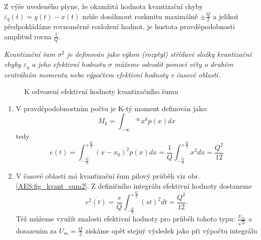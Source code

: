       Z výše uvedeného plyne, že okamžitá hodnota kvantizační chyby $\varepsilon_q(t) = y(t) - x(t)$ může dosáhnout rozkmitu maximálně $\pm \frac{Q}{2}$ a jelikož předpokládáme rovnoměrné rozložení hodnot, je hustota pravděpodobnosti amplitud rovna $\frac{1}{Q}$.

      \emph{Kvantizační šum $\sigma^2$ je definován jako výkon (rozptyl) střídavé složky kvantizační chyby $\varepsilon_q$ a jeho efektivní hodnotu $\sigma$ můžeme odvodit pomocí věty o druhém centrálním momentu nebo výpočtem efektivní hodnoty v časové oblasti.}

        \begin{figure}[ht!]
          \centering
          \caption{K odvození efektivní hodnoty kvantizačního šumu}
          \label{AES:fig_kvant_sum}
        \end{figure}

        \begin{enumerate}
          \item V pravděpodobnostním počtu je K-tý moment definován jako: $$M_k = \int_{-\infty}{^\infty} 
                x^k p(x)dx$$ tedy $$e(t) = \int_{-\frac{Q}{2}}^{+\frac{Q}{2}}(x - x_0)^2p(x)dx = 
                \frac{1}{Q}\int_{-\frac{Q}{2}}^{+\frac{Q}{2}}x^2dx = \frac{Q^2}{12}$$
          \item V časové oblasti má kvantizační šum pilový průběh viz obr. \ref{AES:fig_kvant_sum2}. Z  
                definičního integrálu efektivní hodnoty dostaneme $$ \overline{e^2(t)} = 
                \frac{s}{Q}\int_{-\frac{Q}{2}}^{+\frac{Q}{2}}(st)^2dt = \frac{Q^2}{12}.$$ Též můžeme využít 
                znalosti efektivní hodnoty pro průběh tohoto typu: $\frac{U_m}{\sqrt{3}}$ a dosazením za $U_m 
                =\frac{Q}{2}$ získáme opět stejný výsledek jako při výpočtu integrálu
        \end{enumerate}

